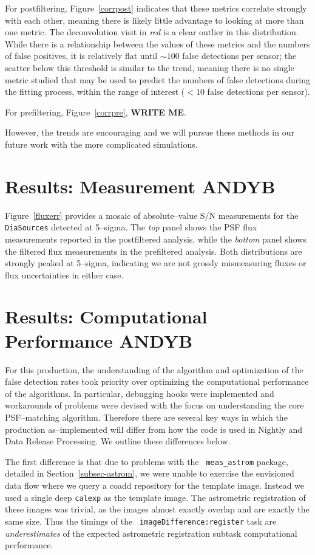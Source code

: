 \documentclass[prd, nofootinbib, floatfix, 11pt,tightenlines,times]{article}
\begin{document}
For postfiltering, Figure~\ref{corrpost} indicates that these metrics
correlate strongly with each other, meaning there is likely little
advantage to looking at more than one metric.  The deconvolution visit
in {\it red} is a clear outlier in this distribution.  While there is
a relationship between the values of these metrics and the numbers of
false positives, it is relatively flat until $\sim 100$ false
detections per sensor; the scatter below this threshold is similar to
the trend, meaning there is no single metric studied that may be used
to predict the numbers of false detections during the fitting process,
within the range of interest ($<10$ false detections per sensor).

For prefiltering, Figure~\ref{corrpre}, {\bf WRITE ME}.

However, the trends are encouraging and we will pursue these methods
in our future work with the more complicated simulations.

\section{Results: Measurement {\bf ANDYB}}

Figure~\ref{fluxerr} provides a mosaic of absolute--value S/N
measurements for the {\tt DiaSources} detected at 5--sigma.  The {\it
  top} panel shows the PSF flux measurements reported in the
postfiltered analysis, while the {\it bottom} panel shows the filtered
flux measurements in the prefiltered analysis.  Both distributions are
strongly peaked at 5--sigma, indicating we are not grossly
mismeasuring fluxes or flux uncertainties in either case.

\section{Results: Computational Performance {\bf ANDYB}}

For this production, the understanding of the algorithm and
optimization of the false detection rates took priority over
optimizing the computational performance of the algorithms.  In
particular, debugging hooks were implemented and workarounds of
problems were devised with the focus on understanding the core
PSF--matching algorithm.  Therefore there are several key ways in
which the production as--implemented will differ from how the code is
used in Nightly and Data Release Processing.  We outline these
differences below.

The first difference is that due to problems with the {\tt
  meas\_astrom} package, detailed in Section~\ref{subsec-astrom}, we
were unable to exercise the envisioned data flow where we query a
coadd repository for the template image.  Instead we used a single
deep {\tt calexp} as the template image.  The astrometric registration
of these images was trivial, as the images almost exactly overlap and
are exactly the same size.  Thus the timings of the {\tt
  imageDifference:register} task are {\it underestimates} of the
expected astrometric registration subtask computational performance.
\end{document}

